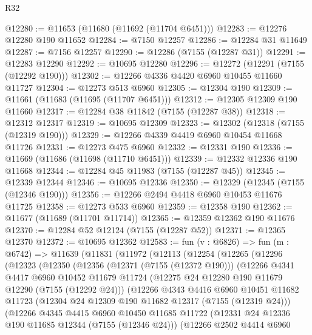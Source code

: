 \begin{lexlean}{R32}
\begin{coremodule}
@12280 := @11653 (@11680 (@11692 (@11704 @6451)))
@12283 := @12276 @12280 @190 @11652
@12284 := @7150 @12257
@12286 := @12284 @31 @11649
@12287 := @7156 @12257
@12290 := @12286 (@7155 (@12287 @31))
@12291 := @12283 @12290
@12292 := @10695 @12280
@12296 := @12272 (@12291 (@7155 (@12292 @190)))
@12302 := @12266 @4336 @4420 @6960 @10455 @11660 @11727
@12304 := @12273 @513 @6960
@12305 := @12304 @190
@12309 := @11661 (@11683 (@11695 (@11707 @6451)))
@12312 := @12305 @12309 @190 @11660
@12317 := @12284 @38 @11842 (@7155 (@12287 @38))
@12318 := @12312 @12317
@12319 := @10695 @12309
@12323 := @12302 (@12318 (@7155 (@12319 @190)))
@12329 := @12266 @4339 @4419 @6960 @10454 @11668 @11726
@12331 := @12273 @475 @6960
@12332 := @12331 @190
@12336 := @11669 (@11686 (@11698 (@11710 @6451)))
@12339 := @12332 @12336 @190 @11668
@12344 := @12284 @45 @11983 (@7155 (@12287 @45))
@12345 := @12339 @12344
@12346 := @10695 @12336
@12350 := @12329 (@12345 (@7155 (@12346 @190)))
@12356 := @12266 @2494 @4418 @6960 @10453 @11676 @11725
@12358 := @12273 @533 @6960
@12359 := @12358 @190
@12362 := @11677 (@11689 (@11701 @11714))
@12365 := @12359 @12362 @190 @11676
@12370 := @12284 @52 @12124 (@7155 (@12287 @52))
@12371 := @12365 @12370
@12372 := @10695 @12362
@12583 := fun (v : @6826) =>
  fun (m : @6742) =>
  @11639
    (@11831
      (@11972
        (@12113
          (@12254
            (@12265
              (@12296
                (@12323
                  (@12350
                    (@12356
                      (@12371 (@7155 (@12372 @190)))
                      (@12266
                        @4341
                        @4417
                        @6960
                        @10452
                        @11679
                        @11724
                        (@12275 @24 @12280 @190 @11679 @12290 (@7155 (@12292 @24)))
                        (@12266
                          @4343
                          @4416
                          @6960
                          @10451
                          @11682
                          @11723
                          (@12304 @24 @12309 @190 @11682 @12317 (@7155 (@12319 @24)))
                          (@12266
                            @4345
                            @4415
                            @6960
                            @10450
                            @11685
                            @11722
                            (@12331 @24 @12336 @190 @11685 @12344 (@7155 (@12346 @24)))
                            (@12266
                              @2502
                              @4414
                              @6960

\end{coremodule}
\end{lexlean}
